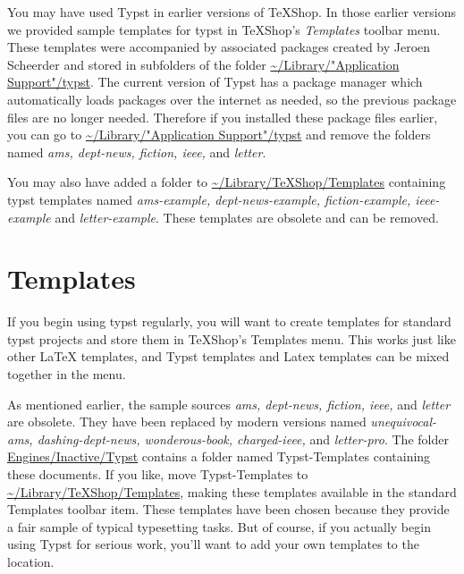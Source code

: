 \documentclass[11pt, oneside]{article}   	%
\begin{document}
You may have used Typst in earlier versions of TeXShop. In those earlier versions we provided sample  templates for typst in TeXShop's {\em Templates} toolbar menu. These templates were accompanied by associated packages created by 
Jeroen Scheerder and stored in subfolders of the folder \url{~/Library/"Application Support"/typst}. 
The current version of Typst has a package manager which automatically loads packages over the internet as needed,
so the previous package files are no longer needed. Therefore if you installed these package files earlier, you can go to \url{~/Library/"Application Support"/typst} and remove the folders named {\em ams, dept-news, fiction, ieee,} and {\em letter}. 

You may also have added a folder  to \url{~/Library/TeXShop/Templates} containing typst  templates named {\em ams-example, dept-news-example, fiction-example, ieee-example} and {\em letter-example}.
These templates are obsolete and can be removed.

\section{Templates}

If you begin using typst regularly, you will want to create templates for standard typst projects
and store them in TeXShop's Templates menu. This works just like other LaTeX templates, and 
Typst templates and Latex templates can be mixed together in the menu. 

As mentioned earlier, the sample sources {\em ams, dept-news, fiction, ieee,} and {\em letter} are obsolete.
They have been replaced by modern versions named
{\em unequivocal-ams, dashing-dept-news, wonderous-book, charged-ieee,} and {\em letter-pro}. 
The folder \url{Engines/Inactive/Typst} contains a folder named Typst-Templates containing these  documents.
If you like, move Typst-Templates to \url{~/Library/TeXShop/Templates}, making these  templates available in the standard Templates toolbar item. These templates have been chosen because they provide a fair sample of typical typesetting tasks.
But of course, if you actually begin using Typst for serious work, you'll want to add your own templates
to the location. 

%
\end{document}
